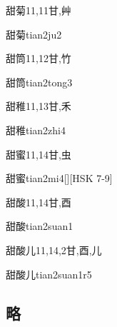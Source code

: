 \begin{Entry}{甜菊}{11,11}{⽢,⾋}
  \begin{Phonetics}{甜菊}{tian2ju2}
  \end{Phonetics}
\end{Entry}

\begin{Entry}{甜筒}{11,12}{⽢,⽵}
  \begin{Phonetics}{甜筒}{tian2tong3}
  \end{Phonetics}
\end{Entry}

\begin{Entry}{甜稚}{11,13}{⽢,⽲}
  \begin{Phonetics}{甜稚}{tian2zhi4}
  \end{Phonetics}
\end{Entry}

\begin{Entry}{甜蜜}{11,14}{⽢,⾍}
  \begin{Phonetics}{甜蜜}{tian2mi4}[][HSK 7-9]
  \end{Phonetics}
\end{Entry}

\begin{Entry}{甜酸}{11,14}{⽢,⾣}
  \begin{Phonetics}{甜酸}{tian2suan1}
  \end{Phonetics}
\end{Entry}

\begin{Entry}{甜酸儿}{11,14,2}{⽢,⾣,⼉}
  \begin{Phonetics}{甜酸儿}{tian2suan1r5}
  \end{Phonetics}
\end{Entry}

\subsection*{略}

